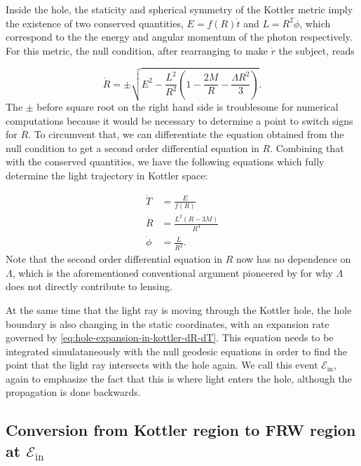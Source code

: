 Inside the hole, the staticity and spherical symmetry of the Kottler metric imply the existence of two conserved quantities, $E = f(R) \dot{t}$ and $L = R^2 \dot{\phi}$, which correspond to the the energy and angular momentum of the photon respectively. For this metric, the null condition, after rearranging to make $\dot{r}$ the subject, reads

\begin{equation}
  \dot{R} = \pm \sqrt{E^2 - \frac{L^2}{R^2} \left ( 1 - \frac{2M}{R} - \frac{\Lambda R^2}{3}\right )}.
  \label{eq:kottler-null-condition}
\end{equation}
The $\pm$ before square root on the right hand side is troublesome for numerical computations because it would be necessary to determine a point to switch signs for $\dot{R}$. To circumvent that, we can differentiate the equation obtained from the null condition to get a second order differential equation in $R$. Combining that with the conserved quantities, we have the following equations which fully determine the light trajectory in Kottler space:

\begin{subequations}
  \begin{align}
    \dot{T} &= \frac{E}{f(R)}\\
    \ddot{R}  &= \frac{L^2 (R-3M)}{R^4}\\
    \dot{\phi} &= \frac{L}{R^2}.
  \end{align}
  \label{eq:kottler-null-geodesics}
\end{subequations}
Note that the second order differential equation in $R$ now has no dependence on $\Lambda$, which is the aforementioned conventional argument pioneered by \citet{islam1983cosmological} for why $\Lambda$ does not directly contribute to lensing. 

At the same time that the light ray is moving through the Kottler hole, the hole boundary is also changing in the static coordinates, with an expansion rate governed by \autoref{eq:hole-expansion-in-kottler-dR-dT}. This equation needs to be integrated simulataneously with the null geodesic equations in order to find the point that the light ray intersects with the hole again. We call this event $\mathcal{E}_{\text{in}}$, again to emphasize the fact that this is where light enters the hole, although the propagation is done backwards. 

\subsection{Conversion from Kottler region to FRW region at $\mathcal{E}_{\text{in}}$}

